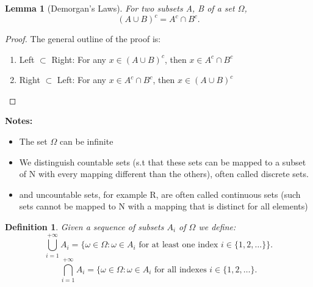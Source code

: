 \documentclass[a4paper]{article}
\newcounter{counter}
\numberwithin{counter}{subsection}
\theoremstyle{break}
\newtheorem{definition}{Definition}
\newtheorem{lemma}[counter]{Lemma}
\begin{document}
				\begin{lemma}[Demorgan's Laws]
					For two subsets A, B of a set $\Omega$, \[
						(A \cup B)^{c} = A^{c} \cap B^{c}
					.\] 
				\end{lemma}

				\newtheorem{proof}{Proof}
				\begin{proof}
					The general outline of the proof is: 
					\begin{enumerate}
						\item Left $\subset$ Right: For any $x \in (A \cup B)^{c}$, then $x \in A^{c} \cap B^{c}$
						\item Right $\subset$ Left: For any $x \in A^{c} \cap B^{c}$, then $x \in (A \cup B)^{c}$   
					\end{enumerate}
				\end{proof}

				\textbf{Notes:} 
				\begin{itemize}
					\item The set $\Omega$ can be infinite 
					\item We distinguish countable sets (s.t that these sets can be mapped to a subset of N with every mapping different than the others), often called discrete sets.
					\item and uncountable sets, for example R, are often called continuous sets (such sets cannot be mapped to N with a mapping that is distinct for all elements)
				\end{itemize}

				\begin{definition}
					Given a sequence of subsets $A_i$ of $\Omega$ we define: \[
						\bigcup_{i=1}^{+\infty} A_i = \{\omega \in \Omega: \omega \in A_i \text{ for at least one index } i \in \{1,2,\ldots\} \} 
					.\] 
					\[
					\bigcap_{i=1}^{+\infty} A_i = \{\omega \in \Omega: \omega \in A_i \text{ for all indexes } i \in \{1,2,\ldots\} 
					.\] 
				\end{definition}
	
\end{document}
